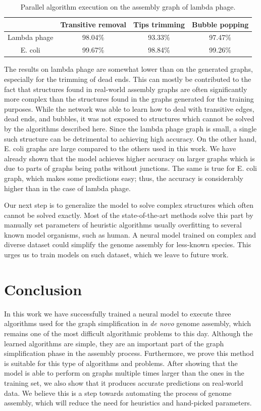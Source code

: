 \documentclass{article}
\begin{document}
\begin{table}[h]
  \caption{Parallel algorithm execution on the assembly graph of lambda phage.}
  \label{table:lambda}
  \centering
  \begin{tabular}{cccc}
    \toprule
    & Transitive removal & Tips trimming & Bubble popping  \\
    \midrule
    Lambda phage & 98.04\% & 93.33\%  & 97.47\%    \\
    E. coli & 99.67\% & 98.84\%  & 99.26\%    \\
    \bottomrule
  \end{tabular}
\end{table}

The results on lambda phage are somewhat lower than on the generated graphs, especially for the trimming of dead ends. This can mostly be contributed to the fact that structures found in real-world assembly graphs are often significantly more complex than the structures found in the graphs generated for the training purposes. While the network was able to learn how to deal with transitive edges, dead ends, and bubbles, it was not exposed to structures which cannot be solved by the algorithms described here. Since the lambda phage graph is small, a single such structure can be detrimental to achieving high accuracy. On the other hand, E. coli graphs are large compared to the others used in this work. We have already shown that the model achieves higher accuracy on larger graphs which is due to parts of graphs being paths without junctions. The same is true for E. coli graph, which makes some predictions easy; thus, the accuracy is considerably higher than in the case of lambda phage.

Our next step is to generalize the model to solve complex structures which often cannot be solved exactly. Most of the state-of-the-art methods solve this part by manually set parameters of heuristic algorithms usually overfitting to several known model organisms, such as human. A neural model trained on complex and diverse dataset could simplify the genome assembly for less-known species. This urges us to train models on such dataset, which we leave to future work.


\section{Conclusion}
In this work we have successfully trained a neural model to execute three algorithms used for the graph simplification in \textit{de novo} genome assembly, which remains one of the most difficult algorithmic problems to this day. Although the learned algorithms are simple, they are an important part of the graph simplification phase in the assembly process. Furthermore, we prove this method is suitable for this type of algorithms and problems. After showing that the model is able to perform on graphs multiple times larger than the ones in the training set, we also show that it produces accurate predictions on real-world data. We believe this is a step towards automating the process of genome assembly, which will reduce the need for heuristics and hand-picked parameters.
\end{document}
